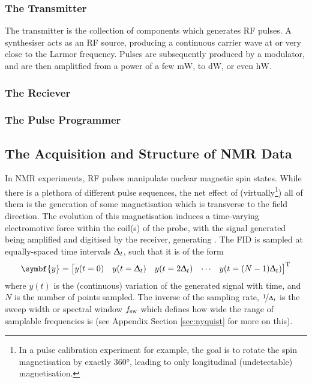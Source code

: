 \subsubsection{The Transmitter}
The transmitter is the collection of components which generates \ac{RF} pulses. A
synthesiser acts as an \ac{RF} source, producing a continuous carrier wave at or
very close to the Larmor frequency. Pulses are subsequently produced by a
modulator, and are then amplitfied from a power of a few $\si{\milli \watt}$,
to $\si{\deca \watt}$, or even $\si{\hecto \watt}$\cite{Keeler2010}.

\subsubsection{The Reciever}

\subsubsection{The Pulse Programmer}

\subsection{The Acquisition and Structure of \acs{NMR} Data}
In \ac{NMR} experiments, \ac{RF} pulses manipulate nuclear magnetic spin
states. While there is a plethora of different pulse sequences, the net effect
of (virtually\footnote{
    In a pulse calibration experiment for example, the goal is to rotate the
    spin magnetisation by exactly \ang{360}, leading to only longitudinal
    (undetectable) magnetisation.
})
all of them is the generation of some magnetisation which is transverse to the
field direction. The evolution of this magnetisation induces a time-varying
electromotive force within the coil(s) of the probe, with the signal generated
being amplified and digitised by the receiver, generating .
The \ac{FID} is sampled at equally-spaced time intervals $\Updelta_t$, such that
it is of the form
\begin{equation}
  \symbf{y} =
  \begin{bmatrix}
      y(t=0) & y(t=\Dt) & y(t=2\Dt) & \cdots & y(t=(N-1)\Dt)
  \end{bmatrix}\T
\end{equation}
where $y(t)$ is the (continuous) variation of the generated signal with time,
and $N$ is the number of points sampled. The inverse of the sampling rate,
$\nicefrac{1}{\Updelta_t}$ is the sweep width or spectral window $f_{\mathrm{sw}}$ which
defines how wide the range of samplable frequencies is (see Appendix Section
\ref{sec:nyquist} for more on this).


